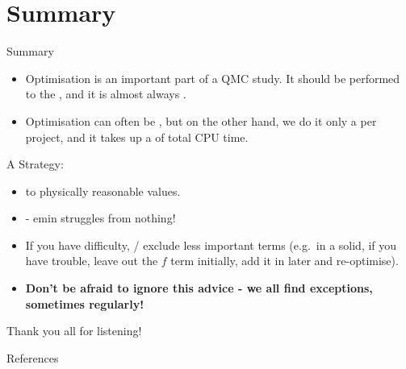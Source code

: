 \documentclass[12pt, pdf, hyperref={draft}, usenames, dvipsnames,
aspectratio=169]{beamer}
\newcommand{\red}[1]{{\bf\color{LancsRed}{#1}}}
\newcommand{\blue}[1]{{\bf\color{NavyBlue}{#1}}}
\newcommand{\green}[1]{{\bf\color{ForestGreen}{#1}}}
\begin{document}
\section{Summary}\label{sec:summary}


\begin{frame}{Summary}
\begin{itemize}
  \item Optimisation is an important part of a QMC study. It should be
  performed to the \blue{best of our ability}, and it is almost always
  \green{worth the extra effort}.
  \item Optimisation can often be \red{tricky}, but on the other hand, we do it
  only a \green{few times} per project, and it takes up a \green{small
  fraction} of total CPU time.
\end{itemize}
\begin{block}{A Strategy:}
  \begin{itemize}
    \item \blue{Fix cut-off lengths} to physically reasonable values.
    \item \blue{Start with varmin / madmin} - emin struggles from nothing!
    \item If you have difficulty, \blue{lower the number of parameters} /
    exclude less important terms (e.g.\ in a solid, if you have trouble, leave
    out the $f$ term initially, add it in later and re-optimise).\pause{}
    \item \textbf{Don't be afraid to ignore this advice - we all find
    exceptions, sometimes regularly!}
  \end{itemize}
\end{block}
\end{frame}





\begin{frame}[plain]
\begin{center}
  {\Huge Thank you all for listening!} \\
\end{center}
\end{frame}


\begin{frame}[t,allowframebreaks]{References}

\printbibliography[]

\end{frame}
\end{document}
